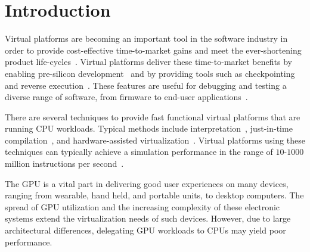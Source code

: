 
\section{Introduction}
\label{sec:introduction}
Virtual platforms are becoming an important tool in the software industry in order to provide cost-effective time-to-market gains and meet the ever-shortening product life-cycles~\cite{journals:magnusson:2002, journals:yi:2006, publications:leupers:2010, publications:aarno:2014}.
Virtual platforms deliver these time-to-market benefits by enabling pre-silicon development~ and by providing tools such as checkpointing and reverse execution~.
These features are useful for debugging and testing a diverse range of software, from firmware to end-user applications~.

There are several techniques to provide fast functional virtual platforms that are running CPU workloads.
Typical methods include interpretation~, just-in-time compilation~, and hardware-assisted virtualization~.
Virtual platforms using these techniques can typically achieve a simulation performance in the range of $10$-$1000$ million instructions per second~.

The GPU is a vital part in delivering good user experiences on many devices, ranging from wearable, hand held, and portable units, to desktop computers.
The spread of GPU utilization and the increasing complexity of these electronic systems extend the virtualization needs of such devices.
However, due to large architectural differences, delegating GPU workloads to CPUs may yield poor performance.

